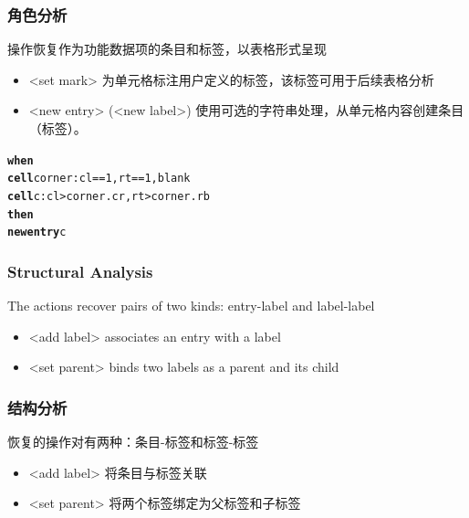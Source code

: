 \documentclass[10pt]{beamer}
\begin{document}
\begin{frame}[fragile]
\frametitle{角色分析}
操作恢复作为功能数据项的条目和标签，以表格形式呈现
\begin{itemize}
	\item \alert{<set mark>} 为单元格标注用户定义的标签，该标签可用于后续表格分析
	\item \alert{<new entry>} (\alert{<new label>}) 使用可选的字符串处理，从单元格内容创建条目（标签）。
\end{itemize}
\footnotesize{
\begin{example}
\begin{alltt}
\textbf{when}
  \textbf{cell} corner: cl == 1, rt == 1, blank
  \textbf{cell} c: cl > corner.cr, rt > corner.rb
\textbf{then}
  \textbf{new entry} c
\end{alltt}
\end{example}
}
\end{frame}



\begin{frame}[fragile]
\frametitle{Structural Analysis}
The actions recover pairs of two kinds: entry-label and label-label
\begin{itemize}
	\item \alert{<add label>} associates an entry with a label
	\item \alert{<set parent>} binds two labels as a parent and its child
\end{itemize}
\footnotesize{
}
\end{frame}

\begin{frame}[fragile]
\frametitle{结构分析}
恢复的操作对有两种：条目-标签和标签-标签
\begin{itemize}
	\item \alert{<add label>} 将条目与标签关联
	\item \alert{<set parent>} 将两个标签绑定为父标签和子标签
\end{itemize}
\footnotesize{
}
\end{frame}
\end{document}
